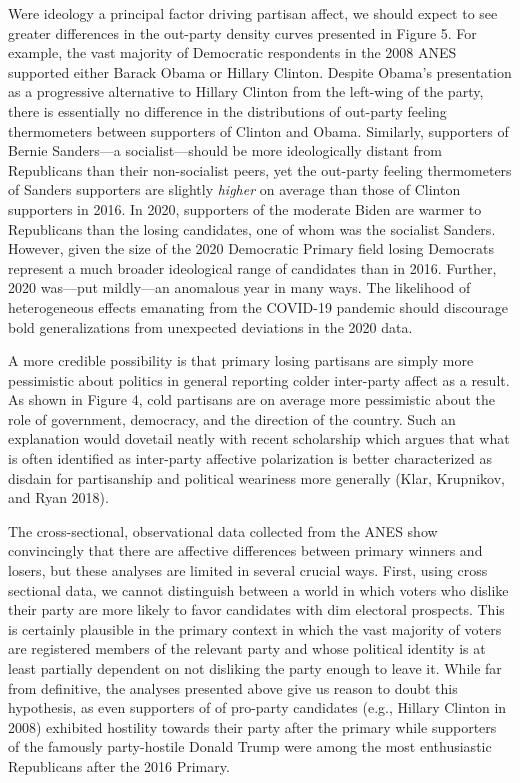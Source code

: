 \documentclass[
]{article}
\begin{document}
Were ideology a principal factor driving partisan affect, we should expect to see greater differences in the out-party density curves presented in Figure 5. For example, the vast majority of Democratic respondents in the 2008 ANES supported either Barack Obama or Hillary Clinton. Despite Obama's presentation as a progressive alternative to Hillary Clinton from the left-wing of the party, there is essentially no difference in the distributions of out-party feeling thermometers between supporters of Clinton and Obama. Similarly, supporters of Bernie Sanders---a socialist---should be more ideologically distant from Republicans than their non-socialist peers, yet the out-party feeling thermometers of Sanders supporters are slightly \emph{higher} on average than those of Clinton supporters in 2016. In 2020, supporters of the moderate Biden are warmer to Republicans than the losing candidates, one of whom was the socialist Sanders. However, given the size of the 2020 Democratic Primary field losing Democrats represent a much broader ideological range of candidates than in 2016. Further, 2020 was---put mildly---an anomalous year in many ways. The likelihood of heterogeneous effects emanating from the COVID-19 pandemic should discourage bold generalizations from unexpected deviations in the 2020 data.

A more credible possibility is that primary losing partisans are simply more pessimistic about politics in general reporting colder inter-party affect as a result. As shown in Figure 4, cold partisans are on average more pessimistic about the role of government, democracy, and the direction of the country. Such an explanation would dovetail neatly with recent scholarship which argues that what is often identified as inter-party affective polarization is better characterized as disdain for partisanship and political weariness more generally (Klar, Krupnikov, and Ryan 2018).

The cross-sectional, observational data collected from the ANES show convincingly that there are affective differences between primary winners and losers, but these analyses are limited in several crucial ways. First, using cross sectional data, we cannot distinguish between a world in which voters who dislike their party are more likely to favor candidates with dim electoral prospects. This is certainly plausible in the primary context in which the vast majority of voters are registered members of the relevant party and whose political identity is at least partially dependent on not disliking the party enough to leave it. While far from definitive, the analyses presented above give us reason to doubt this hypothesis, as even supporters of of pro-party candidates (e.g., Hillary Clinton in 2008) exhibited hostility towards their party after the primary while supporters of the famously party-hostile Donald Trump were among the most enthusiastic Republicans after the 2016 Primary.
\end{document}
